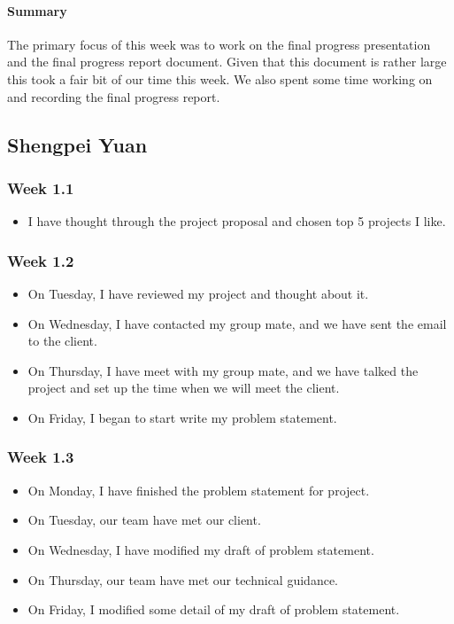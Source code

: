 \documentclass[onecolumn, draftclsnofoot,10pt, compsoc]{article}
\begin{document}
		    \paragraph{Summary} \hfill \break
		        The primary focus of this week was to work on the final progress presentation and the final progress report document. Given that this document is rather large this took a fair bit of our time this week. We also spent some time working on and recording the final progress report.\\

    \subsection{Shengpei Yuan}
				\subsubsection{Week 1.1}
					\begin{itemize}
					\item I have thought through the project proposal and chosen top 5 projects I like.
					\end{itemize}
				\subsubsection{Week 1.2}
					\begin{itemize}
					\item On Tuesday,  I have reviewed my project and thought about it.
					\item On Wednesday, I have contacted my group mate, and we have sent the email to the client.
					\item On Thursday, I have meet with my group mate, and we have talked the project and set up the time when we will meet the client.
					\item On Friday, I began to start write my problem statement.
					\end{itemize}
				\subsubsection{Week 1.3}
					\begin{itemize}
					\item On Monday, I have finished the problem statement for project.
					\item On Tuesday, our team have met our client.
					\item On Wednesday, I have modified my draft of problem statement.
					\item On Thursday, our team have met our technical guidance.
					\item On Friday, I modified some detail of my draft of problem statement.
					\end{itemize}
\end{document}
